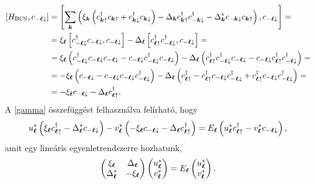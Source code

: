 \documentclass[a4paper,12pt,titlepage]{article}
\newcommand{\KK}{{\vb*{k}}}
\newcommand{\LL}{{\vb*{\ell}}}
\begin{document}
\begin{equation}
\begin{split}
	\left[ H_\text{BCS}, c_{-\LL \downarrow} \right] & = \left[ \sum\limits_\KK \left(\xi_\KK \left( c_{\KK \uparrow}^\dagger c_{\KK \uparrow} + c_{\KK \downarrow}^\dagger c_{\KK \downarrow} \right) - \Delta_\KK c_{\KK \uparrow}^\dagger c_{-\KK \downarrow}^\dagger - \Delta_\KK^* c_{-\KK \downarrow} c_{\KK \uparrow} \right), c_{-\LL \downarrow} \right] = \\
	& = \xi_\LL \left[ c_{-\LL \downarrow}^\dagger c_{-\LL \downarrow}, c_{-\LL \downarrow} \right] - \Delta_\LL \left[ c_{\LL \uparrow}^\dagger c_{-\LL \downarrow}^\dagger, c_{-\LL \downarrow} \right] = \\
	& = \xi_\LL \left( c_{-\LL \downarrow}^\dagger c_{-\LL \downarrow} c_{-\LL \downarrow} - c_{-\LL \downarrow} c_{-\LL \downarrow}^\dagger c_{-\LL \downarrow} \right) - \Delta_\LL \left( c_{\LL \uparrow}^\dagger c_{-\LL \downarrow}^\dagger c_{-\LL \downarrow} - c_{-\LL \downarrow} c_{\LL \uparrow}^\dagger c_{-\LL \downarrow}^\dagger \right) = \\
	& = -\xi_\LL \left( c_{-\LL \downarrow} - c_{-\LL \downarrow} c_{-\LL \downarrow} c_{-\LL \downarrow}^\dagger \right) - \Delta_\LL \left( c_{\LL \uparrow}^\dagger - c_{\LL \uparrow}^\dagger c_{-\LL \downarrow} c_{-\LL \downarrow}^\dagger + c_{\LL \uparrow}^\dagger c_{-\LL \downarrow} c_{-\LL \downarrow}^\dagger \right) = \\
	& = -\xi_\LL c_{-\LL \downarrow} - \Delta_\LL c_{\LL \uparrow}^\dagger.
\end{split}
\end{equation}
A \eqref{gamma} összefüggést felhasználva felírható, hogy
\begin{equation}
	u_\LL^* \left( \xi_\LL c_{\LL \uparrow}^\dagger - \Delta_\LL^* c_{-\LL \downarrow} \right) - v_\LL^* \left( -\xi_\LL c_{-\LL \downarrow} - \Delta_\LL c_{\LL \uparrow}^\dagger \right) = E_\LL \left( u_\LL^* c_{\LL \uparrow}^\dagger - v_\LL^* c_{-\LL \downarrow} \right),
\end{equation}
amit egy lineáris egyenletrendszerre hozhatunk,
\begin{equation}
	\begin{pmatrix}
		\xi_\LL & \Delta_\LL \\
		\Delta_\LL^* & -\xi_\LL
	\end{pmatrix} \begin{pmatrix} u_\LL^* \\ v_\LL^* \end{pmatrix}
	= E_\LL \begin{pmatrix} u_\LL^* \\ v_\LL^* \end{pmatrix}.
\end{equation}
\end{document}
